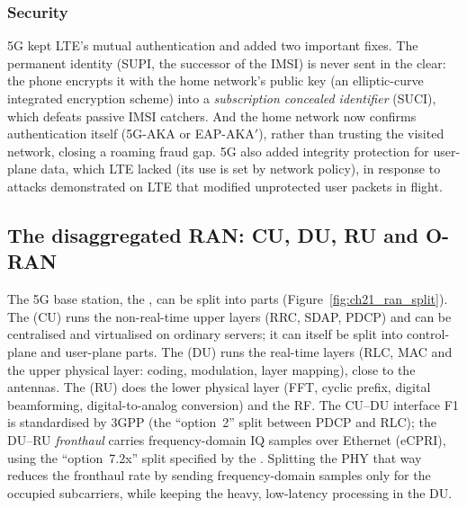 \subsubsection{Security}

5G kept LTE's mutual authentication and added two important fixes. The permanent identity (SUPI, the
successor of the IMSI) is never sent in the clear: the phone encrypts it with the home network's
public key (an elliptic-curve integrated encryption scheme) into a \emph{subscription concealed
identifier} (SUCI), which defeats passive IMSI catchers. And the home network now confirms
authentication itself (5G-AKA or EAP-AKA$'$), rather than trusting the visited network, closing a
roaming fraud gap. 5G also added integrity protection for user-plane data, which LTE lacked (its use
is set by network policy), in response to attacks demonstrated on LTE that modified unprotected user
packets in flight.

\subsection{The disaggregated RAN: CU, DU, RU and O-RAN}

The 5G base station, the , can be split into parts (Figure~\ref{fig:ch21_ran_split}). The
 (CU) runs the non-real-time upper layers (RRC, SDAP, PDCP) and can be
centralised and virtualised on ordinary servers; it can itself be split into control-plane and
user-plane parts. The  (DU) runs the real-time layers (RLC, MAC and the upper
physical layer: coding, modulation, layer mapping), close to the antennas. The  (RU)
does the lower physical layer (FFT, cyclic prefix, digital beamforming, digital-to-analog conversion)
and the RF. The CU--DU interface F1 is standardised by 3GPP (the ``option~2'' split between PDCP and
RLC); the DU--RU \emph{fronthaul} carries frequency-domain IQ samples over Ethernet (eCPRI), using the
``option~7.2x'' split specified by the . Splitting the PHY that way reduces the
fronthaul rate by sending frequency-domain samples only for the occupied subcarriers, while keeping
the heavy, low-latency processing in the DU.

